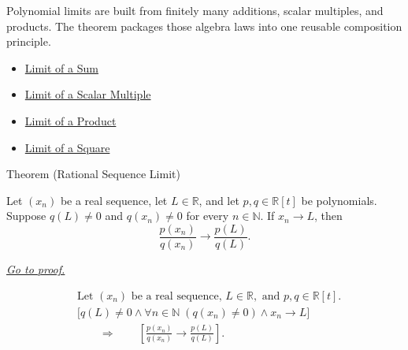 \begin{remark*}[Interpretation]
Polynomial limits are built from finitely many additions, scalar multiples,
and products. The theorem packages those algebra laws into one reusable
composition principle.
\end{remark*}

\begin{dependencies}
\begin{itemize}
  \item \hyperref[thm:limit-of-a-sum]{Limit of a Sum}
  \item \hyperref[thm:limit-of-scalar-multiple]{Limit of a Scalar Multiple}
  \item \hyperref[thm:limit-of-a-product]{Limit of a Product}
  \item \hyperref[thm:limit-of-a-square]{Limit of a Square}
\end{itemize}
\end{dependencies}


\begin{theorembox}{Theorem (Rational Sequence Limit)}
\begin{theorem}
\label{thm:rational-sequence-limit}
Let $(x_n)$ be a real sequence, let $L\in\mathbb{R}$, and let
$p,q\in\mathbb{R}[t]$ be polynomials. Suppose $q(L)\neq 0$ and
$q(x_n)\neq 0$ for every $n\in\mathbb{N}$. If $x_n\to L$, then
\[
\frac{p(x_n)}{q(x_n)}\to \frac{p(L)}{q(L)}.
\]

\smallskip
\noindent
\hyperref[prf:rational-sequence-limit]{\textit{Go to proof.}}
\end{theorem}
\end{theorembox}

\begin{remark*}
\[
\begin{aligned}
&\text{Let } (x_n) \text{ be a real sequence, } L\in\mathbb{R},
  \text{ and } p,q\in\mathbb{R}[t].\\
&\bigl[
q(L)\neq 0
\land
\forall n\in\mathbb{N}\;(q(x_n)\neq 0)
\land
x_n\to L
\bigr]\\
&\qquad\Longrightarrow\qquad
\left[
\frac{p(x_n)}{q(x_n)}\to\frac{p(L)}{q(L)}
\right].
\end{aligned}
\]
\end{remark*}

